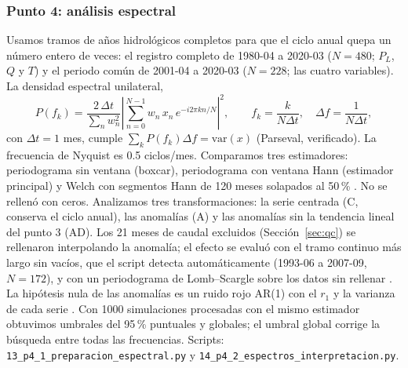 \documentclass[11pt,a4paper]{article}
\newcommand{\archivo}[1]{\nolinkurl{#1}}
\newcommand{\PL}{P_L}
\newcommand{\Qm}{Q}
\begin{document}
\subsubsection{Punto 4: análisis espectral}
\label{sec:met_p4}
Usamos tramos de años hidrológicos completos para que el ciclo anual quepa un número entero de veces: el registro completo de 1980-04 a 2020-03 ($N=480$; $\PL$, $\Qm$ y $T$) y el periodo común de 2001-04 a 2020-03 ($N=228$; las cuatro variables). La densidad espectral unilateral,
\begin{equation}
P(f_k)=\frac{2\,\Delta t}{\sum_n w_n^2}\left|\sum_{n=0}^{N-1} w_n\,x_n\,e^{-i2\pi kn/N}\right|^2,\qquad f_k=\frac{k}{N\Delta t},\quad \Delta f=\frac{1}{N\Delta t},
\end{equation}
con $\Delta t=1$ mes, cumple $\sum_kP(f_k)\Delta f=\mathrm{var}(x)$ (Parseval, verificado). La frecuencia de Nyquist es 0.5 ciclos/mes. Comparamos tres estimadores: periodograma sin ventana (boxcar), periodograma con ventana Hann (estimador principal) y Welch con segmentos Hann de 120 meses solapados al 50\,\% \citep{Welch1967,Harris1978}. No se rellenó con ceros. Analizamos tres transformaciones: la serie centrada (C, conserva el ciclo anual), las anomalías (A) y las anomalías sin la tendencia lineal del punto 3 (AD). Los 21 meses de caudal excluidos (Sección~\ref{sec:qc}) se rellenaron interpolando la anomalía; el efecto se evaluó con el tramo continuo más largo sin vacíos, que el script detecta automáticamente (1993-06 a 2007-09, $N=172$), y con un periodograma de Lomb--Scargle sobre los datos sin rellenar \citep{Lomb1976,Scargle1982}. La hipótesis nula de las anomalías es un ruido rojo AR(1) con el $r_1$ y la varianza de cada serie \citep{Gilman1963,Torrence1998}. Con 1000 simulaciones procesadas con el mismo estimador obtuvimos umbrales del 95\,\% puntuales y globales; el umbral global corrige la búsqueda entre todas las frecuencias. Scripts: \archivo{13_p4_1_preparacion_espectral.py} y \archivo{14_p4_2_espectros_interpretacion.py}.
\end{document}
